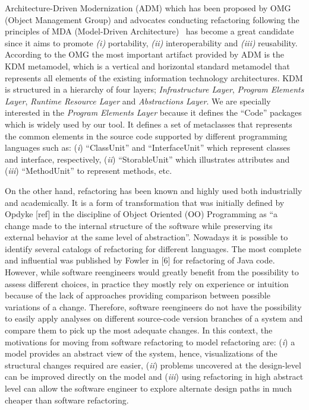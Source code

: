 Architecture-Driven Modernization (ADM) which has been proposed by OMG (Object Management Group) and advocates conducting refactoring following the principles of MDA (Model-Driven Architecture)~\cite{Ulrich:2010:IST:1841736} has become a great candidate since it aims to promote \textit{(i)} portability, \textit{(ii)} interoperability and \textit{(iii)} reusability. According to the OMG the most important artifact provided by ADM is the KDM metamodel, which is a vertical and horizontal standard metamodel that represents all elements of the existing information  technology architectures. KDM is structured in a hierarchy of four layers; \textit{Infrastructure Layer}, \textit{Program Elements Layer}, \textit{ Runtime Resource Layer} and \textit{Abstractions Layer}. We are specially interested in the \textit{Program Elements Layer} because it defines the ``Code'' packages which is widely used by our tool. It defines a set of metaclasses that represents the common elements in the source code supported by different programming languages such as: (\textit{i}) ``ClassUnit'' and ``InterfaceUnit'' which represent classes and interface, respectively, (\textit{ii}) ``StorableUnit'' which illustrates attributes and (\textit{iii}) ``MethodUnit'' to represent methods, etc.

On the other hand, refactoring has been known and highly used both industrially and academically. It is a form of transformation that was initially defined by Opdyke [ref] in the discipline of Object Oriented (OO) Programming as ``a change made to the internal structure of the software while preserving its external behavior at the same level of abstraction''. Nowadays it is possible to identify several catalogs of refactoring for different languages. The most complete and influential was published by Fowler in [6] for refactoring of Java code. 
However, while software reengineers would greatly benefit from the possibility to assess different choices, in practice they mostly rely on experience or intuition because of the lack of approaches providing comparison between possible variations of a change. 
Therefore, software reengineers do not have the possibility to easily apply analyses on different source-code version branches of a system and compare them to pick up the most adequate changes. In this context, the motivations for moving from software refactoring  to model refactoring are: 
(\textit{i}) a model provides an abstract view of the system, hence, visualizations of the structural changes required are easier, 
(\textit{ii}) problems uncovered at the design-level can be improved directly on the model and 
(\textit{iii}) using refactoring in high abstract level can allow the software engineer to explore alternate design paths in much cheaper than software refactoring.

